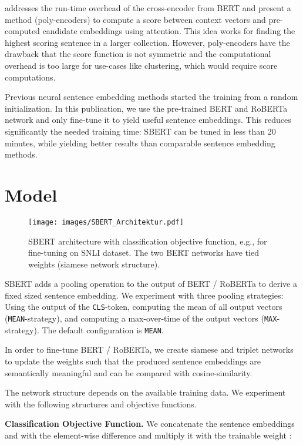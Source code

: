 \documentclass[11pt,a4paper]{article}
\begin{document}
 addresses the run-time overhead of the cross-encoder from BERT and present a method (poly-encoders) to compute a score between  context vectors and pre-computed candidate embeddings using attention. This idea works for finding the highest scoring sentence in a larger collection. However, poly-encoders have the drawback that the score function is not symmetric and the computational overhead is too large for use-cases like clustering, which would require  score computations. 

Previous neural sentence embedding methods started the training from a random initialization. In this publication, we use the pre-trained BERT and RoBERTa network and only fine-tune it to yield useful sentence embeddings. This reduces significantly the needed training time: SBERT can be tuned in less than 20 minutes, while yielding better results than comparable sentence embedding methods.


\section{Model} \label{sec_model}


\begin{figure}[t]
	\centering
	\texttt{[image: images/SBERT\_Architektur.pdf]}
	\caption{SBERT architecture with classification objective function, e.g., for fine-tuning on SNLI dataset. The two BERT networks have tied weights (siamese network structure).}
	\label{fig_sbert_softmax}
\end{figure}


SBERT adds a pooling operation to the output of BERT / RoBERTa to derive a fixed sized sentence embedding.  We experiment with three pooling strategies: Using the output of the \texttt{CLS}-token, computing the mean of all output vectors (\texttt{MEAN}-strategy), and computing a max-over-time of the output vectors (\texttt{MAX}-strategy). The default configuration is \texttt{MEAN}.

In order to fine-tune BERT / RoBERTa, we create siamese and triplet networks \cite{triplet_network} to update the weights such that the produced sentence embeddings are semantically meaningful and can be compared with cosine-similarity.


The network structure depends on the available training data. We experiment with the following structures and objective functions.

\textbf{Classification Objective Function.} We concatenate the sentence embeddings  and  with the element-wise difference  and multiply it with the trainable weight :
\end{document}
